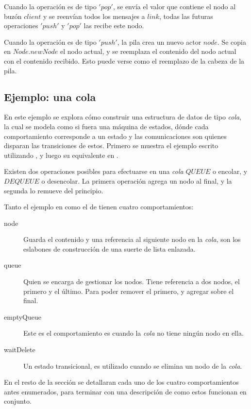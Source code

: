 Cuando la operación es de tipo $'pop'$, se envía el valor que contiene el nodo al buzón $client$ y se reenvían todos los mensajes a $link$, todas las futuras operaciones $'push'$ y $'pop'$ las recibe este nodo.

Cuando la operación es de tipo $'push'$, la pila crea un nuevo actor $node$. Se copia en $Node.newNode$ el nodo actual, y se reemplaza el contenido del nodo actual con el contenido recibido. Esto puede verse como el reemplazo de la cabeza de la pila.

\subsection{Ejemplo: una cola}\label{ejemplo:cola}

En este ejemplo se explora cómo construir una estructura de datos de tipo \textit{cola}, la cual se modela como si fuera una máquina de estados, dónde cada comportamiento corresponde a un estado y las comunicaciones son quienes disparan las transiciones de estos. Primero se muestra el ejemplo escrito utilizando \SAL, y luego su equivalente en \CSP.

Existen dos operaciones posibles para efectuarse en una \textit{cola} $QUEUE$ o encolar, y $DEQUEUE$ o desencolar. La primera operación agrega un nodo al final, y la segunda lo remueve del principio. 

Tanto el ejemplo en \SAL como el de \CSP tienen cuatro comportamientos:

\begin{description}
 \item [node] Guarda el contenido y una referencia al siguiente nodo en la \textit{cola}, son los eslabones de construcción de una suerte de lista enlazada.
 \item [queue] Quien se encarga de gestionar los nodos. Tiene referencia a dos nodos, el primero y el último. Para poder remover el primero, y agregar sobre el final.
 \item [emptyQueue] Este es el comportamiento es cuando la \textit{cola} no tiene ningún nodo en ella.
 \item [waitDelete] Un estado transicional, es utilizado cuando se elimina un nodo de la \textit{cola}.
\end{description}

En el resto de la sección se detallaran cada uno de los cuatro comportamientos antes enumerados, para terminar con una descripción de como estos funcionan en conjunto.

